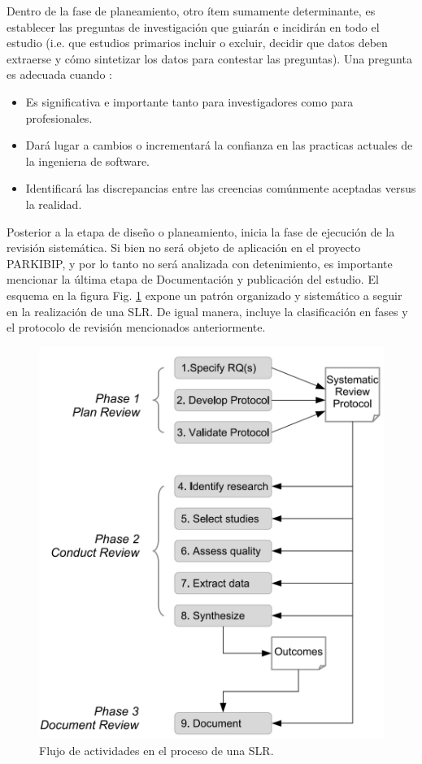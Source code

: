 \noindent Dentro de la fase de planeamiento, otro ítem sumamente determinante, es establecer las preguntas de investigación que guiarán e incidirán en todo el estudio (i.e. que estudios primarios incluir o excluir, decidir que datos deben extraerse y cómo sintetizar los datos para contestar las preguntas). Una pregunta es adecuada cuando \cite{Kitchenham2004}:

\begin{itemize}
    \item Es significativa e importante tanto para investigadores como para profesionales.
    \item Dará lugar a cambios o incrementará la confianza en las practicas actuales de la ingenierıa de software.
    \item Identificará las discrepancias entre las creencias comúnmente aceptadas versus la realidad.
\end{itemize}

Posterior a la etapa de diseño o planeamiento, inicia la fase de ejecución de la revisión sistemática. Si bien no será objeto de aplicación en el proyecto PARKIBIP, y por lo tanto no será analizada con detenimiento, es importante mencionar la última etapa de Documentación y publicación del estudio. El esquema en la figura Fig. \ref{fig:review_phases} expone un patrón organizado y sistemático a seguir en la realización de una SLR. De igual manera, incluye la clasificación en fases y el protocolo de revisión mencionados anteriormente.

\begin{figure}[h!]
\includegraphics[width=\textwidth]{TESIS/imagenes/chap02/review_phases.PNG}
\caption{Flujo de actividades en el proceso de una SLR. \cite{Kitchenham2006}}\label{fig:review_phases}
\end{figure}

